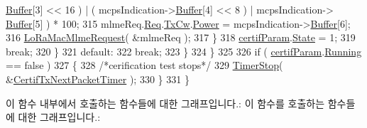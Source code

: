 \begin{DoxyCode}
      \mbox{\hyperlink{structs_mcps_indication_a095175dabcb7cd83bddf2bea50371121}{Buffer}}[3] << 16 ) | ( mcpsIndication->\mbox{\hyperlink{structs_mcps_indication_a095175dabcb7cd83bddf2bea50371121}{Buffer}}[4] << 8 ) | mcpsIndication->
      \mbox{\hyperlink{structs_mcps_indication_a095175dabcb7cd83bddf2bea50371121}{Buffer}}[5] ) * 100;
315               mlmeReq.\mbox{\hyperlink{structs_mlme_req_ae8fae82634858192f75515c1b7daaadc}{Req}}.\mbox{\hyperlink{unions_mlme_req_1_1u_mlme_param_aa69808af2b2999fc4b8b409b593173ab}{TxCw}}.\mbox{\hyperlink{structs_mlme_req_tx_cw_ab44615b5dd16068c5a1bfb228b72c081}{Power}} = mcpsIndication->\mbox{\hyperlink{structs_mcps_indication_a095175dabcb7cd83bddf2bea50371121}{Buffer}}[6];
316               \mbox{\hyperlink{group___l_o_r_a_m_a_c_ga097113f30feecc17c780940ff74af33e}{LoRaMacMlmeRequest}}( &mlmeReq );
317           \}
318           \mbox{\hyperlink{lora-test_8c_afed64ac962fb28f92cbc92acb72b0b7a}{certifParam}}.\mbox{\hyperlink{struct_compliance_test__s_a9ac4c1f881137da2601ed5d333bb5989}{State}} = 1;
319           \textcolor{keywordflow}{break};
320         \}
321         \textcolor{keywordflow}{default}:                  
322           \textcolor{keywordflow}{break};
323         \}
324     \}
325   
326     \textcolor{keywordflow}{if} ( \mbox{\hyperlink{lora-test_8c_afed64ac962fb28f92cbc92acb72b0b7a}{certifParam}}.\mbox{\hyperlink{struct_compliance_test__s_ae2e97f1ebd7c956e2c68d1209eabd4b1}{Running}} == \textcolor{keyword}{false} )
327     \{
328       \textcolor{comment}{/*cerification test stops*/}
329       \mbox{\hyperlink{time_server_8c_a8ae899c4e8a9abf49d825d6959aa6bcb}{TimerStop}}( &\mbox{\hyperlink{lora-test_8c_a0c9bb346324d81b31bd460c40b151cdd}{CertifTxNextPacketTimer}} );
330     \}
331 \}
\end{DoxyCode}
이 함수 내부에서 호출하는 함수들에 대한 그래프입니다.\+:
이 함수를 호출하는 함수들에 대한 그래프입니다.\+:

